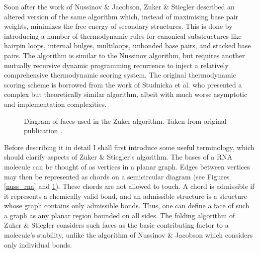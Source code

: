 \documentclass{cshonours}
\begin{document}
Soon after the work of Nussinov \& Jacobson, Zuker \& Stiegler \cite{zuker1981optimal}
described an altered version of the same algorithm which, instead of maximising
base pair weights, minimizes the free energy of secondary structures. This is done
by introducing a number of thermodynamic rules for canonical substructures like
hairpin loops, internal bulges, multiloops, unbonded base pairs, and stacked base
pairs. The algorithm is similar to the Nussinov algorithm, but requires another mutually recursive dynamic programming recurrence to inject
a relatively comprehensive thermodynamic scoring system. The original thermodynamic scoring scheme is borrowed from the work of Studnicka et al. \cite{studnicka1978computer} who presented a
complex but theoretically similar algorithm, albeit with
much worse asymptotic and implementation complexities. 


\begin{figure}
\begin{center}
\end{center}
\caption{Diagram of faces used in the Zuker algorithm. Taken from original
publication \cite{zuker1981optimal}.}
\label{zuk_struct}
\end{figure}

Before describing it in detail I shall first introduce some useful terminology, which should clarify aspects of Zuker \& Stiegler’s
algorithm. The bases of a RNA molecule can be thought of as vertices in a planar graph. Edges between vertices may then be represented as chords on a semicircular diagram (see Figures \ref{nuss_rna} and \ref{zuk_struct}). These chords are not allowed to touch. A chord
is admissible if it represents a chemically valid bond, and an
admissible structure is a structure whose graph contains only admissible bonds.
Thus, one can define a face of such a graph as any planar region bounded on all
sides. The
folding algorithm of Zuker \& Stiegler considers such faces as the basic contributing factor to a molecule's stability, unlike the algorithm of Nussinov \& Jacobson
which considers only individual bonds.
\end{document}
